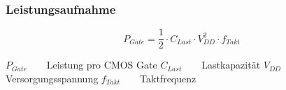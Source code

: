 \subsubsection{Leistungsaufnahme}
\begin{multicols}{2}
        \begin{minipage}{\linewidth}
\[ P_{Gate}= \frac{1}{2} \cdot C_{Last} \cdot V_{DD}^2\cdot f_{Takt} \]
    \end{minipage}
    
\begin{minipage}{\linewidth}
    $ P_{Gate} \qquad$Leistung pro CMOS Gate \newline
    $ C_{Last} \qquad $Lastkapazität\newline
    $ V_{DD}\qquad $Versorgungsspannung\newline
    $ f_{Takt} \qquad$Taktfrequenz
\end{minipage}
\end{multicols}

